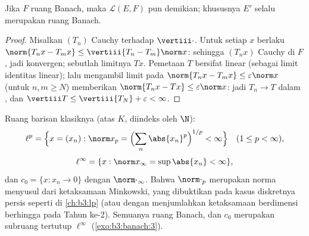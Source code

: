 \begin{proposition}\label{prop:b3:banach:llcomplete}
Jika $F$ ruang Banach, maka $\mathcal L(E, F)$ pun demikian;
khususnya $E'$ selalu merupakan ruang Banach.
\end{proposition}

\begin{proof}
Misalkan $(T_n)$ Cauchy terhadap $\vertiii\cdot$. Untuk setiap $x$ berlaku
$\norm{T_nx - T_mx} \leq \vertiii{T_n - T_m}\norm x$: sehingga $(T_nx)$
Cauchy di $F$, jadi konvergen; sebutlah limitnya $Tx$. Pemetaan $T$ bersifat
linear (sebagai limit identitas linear); lalu mengambil limit pada
$\norm{T_nx - T_mx} \leq \varepsilon\norm x$ (untuk $n, m \geq N$)
memberikan $\norm{T_nx - Tx} \leq \varepsilon\norm x$: jadi $T_n \to T$
dalam , dan $\vertiii T \leq \vertiii{T_N} +
\varepsilon < \infty$.
\end{proof}

\begin{definition}\label{def:b3:banach:lp}
Ruang barisan klasiknya
(atas $K$, diindeks oleh $\N$):
\[
\ell^p = \Bigl\{x = (x_n) : \norm x_p = \Bigl(\sum_n
\abs{x_n}^p\Bigr)^{1/p} < \infty\Bigr\}\quad (1 \leq p <
\infty),
\]
\[
\ell^\infty = \{x : \norm x_\infty = \sup\abs{x_n} < \infty\},
\]
dan $c_0 = \{x : x_n \to 0\}$ dengan $\norm\cdot_\infty$. Bahwa
$\norm\cdot_p$ merupakan norma menyusul dari ketaksamaan Minkowski,
yang dibuktikan pada kasus diskretnya persis seperti di \cref{ch:b3:lp} (atau
dengan menjumlahkan ketaksamaan berdimensi berhingga pada Tahun ke-2). Semuanya
ruang Banach, dan $c_0$ merupakan subruang tertutup
$\ell^\infty$ (\cref{exo:b3:banach:3}).
\end{definition}


